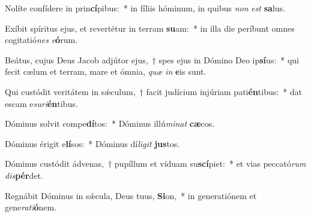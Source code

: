 \item Nolíte confídere in prin\textbf{cí}pibus:~* in fíliis hóminum, in quibus \textit{non} \textit{est} \textbf{sa}lus.
\item Exíbit spíritus ejus, et revertétur in terram \textbf{su}am:~* in illa die períbunt omnes cogitatió\textit{nes} \textit{e}\textbf{ó}rum.
\item Beátus, cujus Deus Jacob adjútor ejus,~† spes ejus in Dómino Deo ip\textbf{sí}us:~* qui fecit cælum et terram, mare et ómnia, \textit{quæ} \textit{in} \textbf{e}is sunt.
\item Qui custódit veritátem in sǽculum,~† facit judícium injúriam pati\textbf{én}tibus:~* dat escam e\textit{su}\textit{ri}\textbf{én}tibus.
\item Dóminus solvit compe\textbf{dí}tos:~* Dóminus illú\textit{mi}\textit{nat} \textbf{cæ}cos.
\item Dóminus érigit e\textbf{lí}sos:~* Dóminus dí\textit{li}\textit{git} \textbf{jus}tos.
\item Dóminus custódit ádvenas,~† pupíllum et víduam su\textbf{scí}piet:~* et vias peccató\textit{rum} \textit{dis}\textbf{pér}det.
\item Regnábit Dóminus in sǽcula, Deus tuus, \textbf{Si}on,~* in generatiónem et gene\textit{ra}\textit{ti}\textbf{ó}nem.
